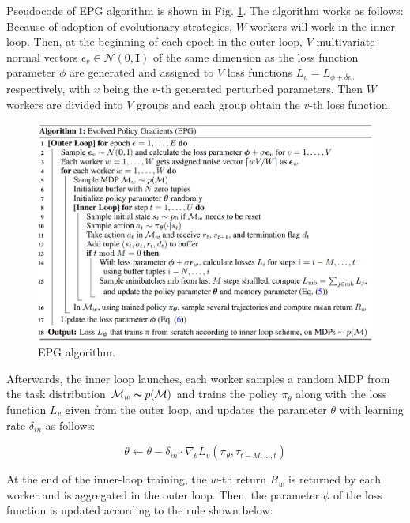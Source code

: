 \par
Pseudocode of EPG algorithm is shown in Fig. \ref{epg}. The algorithm works as follows: Because of adoption of evolutionary strategies, $\textit{W}$ workers will work in the inner loop. Then, at the beginning of each epoch in the outer loop, $\textit{V}$ multivariate normal vectors $\epsilon_v \in \mathcal{N}(0,\mathbf{I})$ of the same dimension as the loss function parameter $\phi$ are generated and assigned to $\textit{V}$ loss functions $L_v = L_{\phi+\delta\epsilon_v}$ respectively, with $\textit{v}$ being the $\textit{v}$-th generated perturbed parameters. Then $\textit{W}$ workers are divided into $\textit{V}$ groups and each group obtain the $\textit{v}$-th loss function.
\begin{figure}[H]
	\includegraphics[scale=0.4]{epg.png}
	\centering
	\caption{EPG algorithm.}
	\label{epg}
\end{figure}

\par
Afterwards, the inner loop launches, each worker samples a random MDP from the task distribution $\mathcal{M}_w\thicksim p(\mathcal{M})$ and trains the policy $\pi_\theta$ along with the loss function $L_v$ given from the outer loop, and updates the parameter $\theta$ with learning rate $\delta_{in}$ as follows:

\[\theta\gets\theta - \delta_{in}\cdot\nabla_\theta L_v(\pi_\theta,\tau_{t-M,...,t})\]

\par
At the end of the inner-loop training, the $\textit{w}$-th return $R_w$ is returned by each worker and is aggregated in the outer loop. Then, the parameter $\phi$ of the loss function is updated according to the rule shown below:

